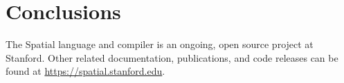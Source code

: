 \chapter{Conclusions}
\label{conclusion}


The Spatial language and compiler is an ongoing, open source project at Stanford.
Other related documentation, publications, and code releases can be found
at \url{https://spatial.stanford.edu}.

